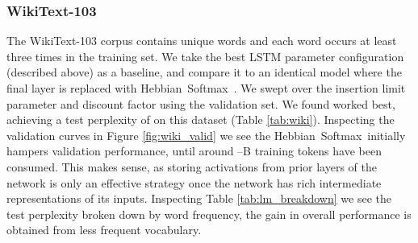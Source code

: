 \documentclass{article} \usepackage{hyperref}
\newcommand{\model}{\hbox{Hebbian Softmax }}
\begin{document}
\subsubsection{WikiText-103}
The WikiText-103 corpus contains  unique words and each word occurs at least three times in the training set. We take the best LSTM parameter configuration (described above) as a baseline, and compare it to an identical model where the final layer is replaced with \model. We swept over the insertion limit parameter  and discount factor  using the validation set. We found  worked best, achieving a test perplexity of  on this dataset (Table \ref{tab:wiki}). Inspecting the validation curves in Figure \ref{fig:wiki_valid} we see the \model initially hampers validation performance, until around --B training tokens have been consumed. This makes sense, as storing activations from prior layers of the network is only an effective strategy once the network has rich intermediate representations of its inputs. Inspecting Table \ref{tab:lm_breakdown} we see the test perplexity broken down by word frequency, the gain in overall performance is obtained from less frequent vocabulary.
\end{document}
